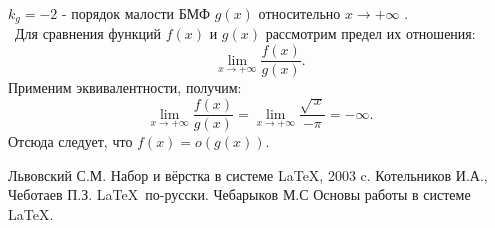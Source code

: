 \documentclass[12pt]{article}
\begin{document}
$k_g = -2$ - порядок малости БМФ $g(x)$ относительно $x\rightarrow+\infty$ .
$$
$$
~Для сравнения функций $f(x)$ и $g(x)$ рассмотрим предел их отношения:
$$
\lim\limits_{x\rightarrow+\infty}\dfrac{f(x)}{g(x)}.
$$
Применим эквивалентности, получим:
$$
\lim\limits_{x\rightarrow+\infty}\dfrac{f(x)}{g(x)} = 
\lim\limits_{x\rightarrow+\infty}\dfrac{{\sqrt{\,x}}}{-\pi} = - \infty .
$$
Отсюда следует, что $f(x) = o(g(x))$.
\newpage
{}
\begin{thebibliography}{99}
 Львовский С.М. Набор и вёрстка в системе \LaTeX, 2003 c.
 Котельников И.А., Чеботаев П.З. \LaTeX~по-русски.
 Чебарыков М.С Основы работы в системе \LaTeX.
\end{thebibliography}
\end{document}
